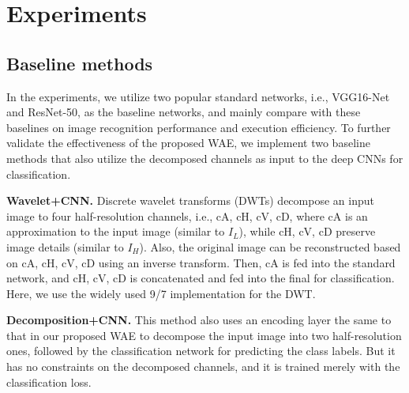 \documentclass[letterpaper]{article} %
\begin{document}
\section{Experiments}
\subsection{Baseline methods}
In the experiments, we utilize two popular standard networks, i.e., VGG16-Net and ResNet-50, as the baseline networks, and mainly compare with these baselines on image recognition performance and execution efficiency. To further validate the effectiveness of the proposed WAE, we implement two baseline methods that also utilize the decomposed channels as input to the deep CNNs for classification.

\noindent\textbf{Wavelet+CNN. }Discrete wavelet transforms (DWTs) decompose an input image to four half-resolution channels, i.e., cA, cH, cV, cD, where cA is an approximation to the input image (similar to $I_L$), while cH, cV, cD preserve image details (similar to $I_H$). Also, the original image can be reconstructed based on cA, cH, cV, cD using an inverse transform. Then, cA is fed into the standard network, and cH, cV, cD is concatenated and fed into the final for classification. Here, we use the widely used 9/7 implementation \cite{zhang2011fsim} for the DWT.

\noindent\textbf{Decomposition+CNN. }This method also uses an encoding layer the same to that in our proposed WAE to decompose the input image into two half-resolution ones, followed by the classification network for predicting the class labels. But it has no constraints on the decomposed channels, and it is trained merely with the classification loss.
\end{document}
